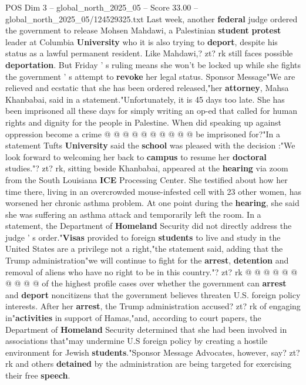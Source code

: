\begin{textsample}{POS Dim 3 – global\_north\_2025\_05 – Score 33.00 – global\_north\_2025\_05/124529325.txt}
Last week, another \textbf{federal} judge ordered the government to release Mohsen Mahdawi, a Palestinian \textbf{student} \textbf{protest} leader at Columbia \textbf{University} who it is also trying to \textbf{deport}, despite his status as a lawful permanent resident.
Like Mahdawi,? zt? rk still faces possible \textbf{deportation}.
But Friday ' s ruling means she won't be locked up while she fights the government ' s attempt to \textbf{revoke} her legal status.
Sponsor Message"We are relieved and ecstatic that she has been ordered released,"her \textbf{attorney}, Mahsa Khanbabai, said in a statement."Unfortunately, it is 45 days too late.
She has been imprisoned all these days for simply writing an op-ed that called for human rights and dignity for the people in Palestine.
When did speaking up against oppression become a crime @ @ @ @ @ @ @ @ @ @ be imprisoned for?"In a statement Tufts \textbf{University} said the \textbf{school} was pleased with the decision :"We look forward to welcoming her back to \textbf{campus} to resume her \textbf{doctoral} studies."? zt? rk, sitting beside Khanbabai, appeared at the \textbf{hearing} via zoom from the South Louisiana \textbf{ICE} Processing Center.
She testified about how her time there, living in an overcrowded mouse-infested cell with 23 other women, has worsened her chronic asthma problem.
At one point during the \textbf{hearing}, she said she was suffering an asthma attack and temporarily left the room.
In a statement, the Department of \textbf{Homeland} Security did not directly address the judge ' s order."\textbf{Visas} provided to foreign \textbf{students} to live and study in the United States are a privilege not a right,"the statement said, adding that the Trump administration"we will continue to fight for the \textbf{arrest}, \textbf{detention} and removal of aliens who have no right to be in this country."? zt? rk @ @ @ @ @ @ @ @ @ @ of the highest profile cases over whether the government can \textbf{arrest} and \textbf{deport} noncitizens that the government believes threaten U.S. foreign policy interests.
After her \textbf{arrest}, the Trump administration accused? zt? rk of engaging in"\textbf{activities} in support of Hamas,"and, according to court papers, the Department of \textbf{Homeland} Security determined that she had been involved in associations that"may undermine U.S foreign policy by creating a hostile environment for Jewish \textbf{students}."Sponsor Message Advocates, however, say? zt? rk and others \textbf{detained} by the administration are being targeted for exercising their free \textbf{speech}.

\end{textsample}
